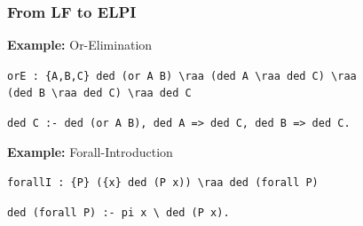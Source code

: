 \documentclass{beamer}
\begin{document}
\begin{frame}[fragile]
    \frametitle{From LF to ELPI}

    \begin{block}{{\bfseries Example:} Or-Elimination}
    \vspace{0.5em}
    \begin{minipage}{0.85\textwidth}
        \lstinline[keepspaces=true,language=MMT]|orE : {A,B,C} ded (or A B) \raa (ded A \raa ded C) \raa|
        \lstinline[keepspaces=true,language=MMT]|                 (ded B \raa ded C) \raa ded C|
    \end{minipage}

    \vspace{1em}
    \lstinline[language=ELPI,keepspaces=true]|ded C :- ded (or A B), ded A => ded C, ded B => ded C.|
    \vspace{0.5em}
    \end{block}

    \vspace{1em}

    \begin{block}{{\bfseries Example:} Forall-Introduction}
    \vspace{0.5em}
    \begin{minipage}{0.85\textwidth}
        \lstinline[keepspaces=true,language=MMT]|forallI : {P} ({x} ded (P x)) \raa ded (forall P)|
    \end{minipage}

    \vspace{1em}
    \lstinline[language=ELPI,keepspaces=true]|ded (forall P) :- pi x \ ded (P x).|
    \vspace{0.5em}
    \end{block}
\end{frame}
\end{document}
